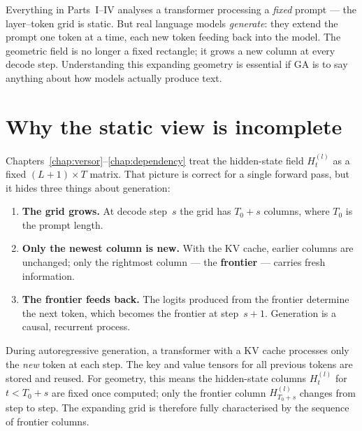 \documentclass[11pt, twoside, openright]{memoir}
\numberwithin{equation}{chapter}
\begin{document}
\begin{whycare}
Everything in Parts~I--IV analyses a transformer processing a
\emph{fixed} prompt --- the layer--token grid is static.
But real language models \emph{generate}: they extend the prompt one
token at a time, each new token feeding back into the model.
The geometric field is no longer a fixed rectangle; it grows a new
column at every decode step.
Understanding this expanding geometry is essential if GA is to say
anything about how models actually produce text.
\end{whycare}


\section{Why the static view is incomplete}
\label{sec:frontier-static}

Chapters~\ref{chap:versor}--\ref{chap:dependency} treat the
hidden-state field $H^{(l)}_t$ as a fixed $(L+1) \times T$ matrix.
That picture is correct for a single forward pass, but it hides
three things about generation:

\begin{enumerate}[nosep]
\item \textbf{The grid grows.}  At decode step~$s$ the grid has
  $T_0 + s$ columns, where $T_0$ is the prompt length.
\item \textbf{Only the newest column is new.}  With the KV cache,
  earlier columns are unchanged; only the rightmost column ---
  the \textbf{frontier} --- carries fresh information.
\item \textbf{The frontier feeds back.}  The logits produced from
  the frontier determine the next token, which becomes the
  frontier at step~$s+1$.  Generation is a causal, recurrent
  process.
\end{enumerate}

\begin{transformer}
During autoregressive generation, a transformer with a KV cache
processes only the \emph{new} token at each step.  The key and value
tensors for all previous tokens are stored and reused.
For geometry, this means the hidden-state columns $H^{(l)}_{t}$ for
$t < T_0 + s$ are fixed once computed; only the frontier column
$H^{(l)}_{T_0+s}$ changes from step to step.
The expanding grid is therefore fully characterised by the sequence
of frontier columns.
\end{transformer}
\end{document}
